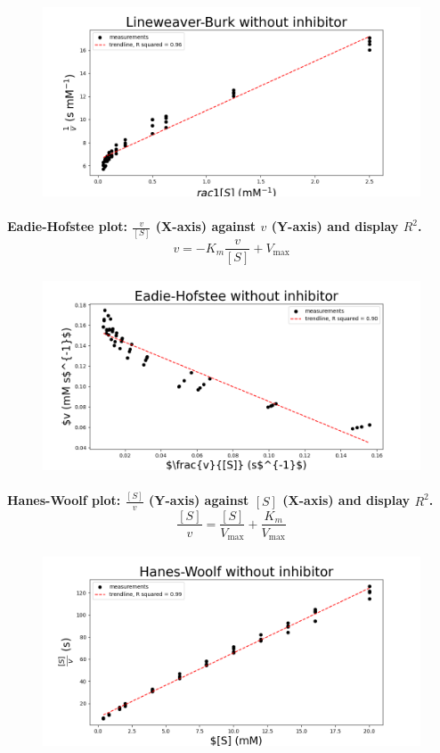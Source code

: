 \documentclass[a4paper,12pt]{article}
\begin{document}
\begin{figure}[!ht]
    \includegraphics[scale=0.5]{fig2_2.png}
    \centering
\end{figure}

\paragraph{Eadie-Hofstee plot: $\frac{v}{[S]}$ (X-axis) against $v$ (Y-axis) and display $R^2$. \[v=-K_m\frac{v}{[S]}+V_{\text{max}}\]}

\begin{figure}[!ht]
    \includegraphics[scale=0.5]{fig2_3.png}
    \centering
\end{figure}

\paragraph{Hanes-Woolf plot: $\frac{[S]}{v}$ (Y-axis) against $[S]$ (X-axis) and display $R^2$. \[\frac{[S]}{v}=\frac{[S]}{V_{\text{max}}}+\frac{K_m}{V_{\text{max}}}\]}

\begin{figure}[!ht]
    \includegraphics[scale=0.5]{fig2_4.png}
    \centering
\end{figure}
\end{document}
